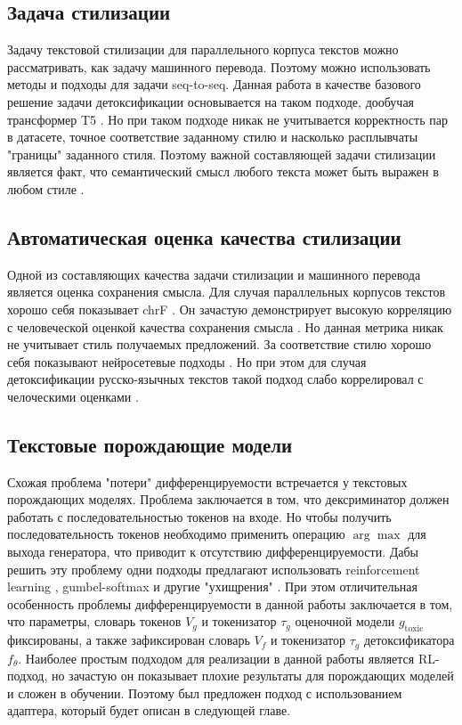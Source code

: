 \subsection{Задача стилизации}

Задачу текстовой стилизации для параллельного корпуса текстов можно рассматривать, как задачу машинного перевода. 
Поэтому можно использовать методы и подходы для задачи seq-to-seq. 
Данная работа в качестве базового решение задачи детоксификации основывается на таком подходе, дообучая трансформер T5 \cite{t5}.
Но при таком подходе никак не учитывается корректность пар в датасете, точное соответствие заданному стилю и насколько расплывчаты "границы" заданного стиля.
Поэтому важной составляющей задачи стилизации является факт, что семантический смысл любого текста может быть выражен в любом стиле \cite{Tikhonov2018WhatIW}.   

\subsection{Автоматическая оценка качества стилизации}
Одной из составляющих качества задачи стилизации и машинного перевода является оценка сохранения смысла. 
Для случая параллельных корпусов текстов хорошо себя показывает chrF \cite{popovic-2015-chrf}.
Он зачастую демонстрирует высокую корреляцию с человеческой оценкой качества сохранения смысла \cite{briakou-etal-2021-evaluating, logacheva-etal-2022-study}. 
Но данная метрика никак не учитывает стиль получаемых предложений.
За соответствие стилю хорошо себя показывают нейросетевые подходы \cite{briakou-etal-2021-evaluating}. 
Но при этом для случая детоксификации русско-язычных текстов такой подход слабо коррелировал с челоческими оценками \cite{logacheva-etal-2022-study}.

\subsection{Текстовые порождающие модели}
Схожая проблема "потери" дифференцируемости встречается у текстовых порождающих моделях. 
Проблема заключается в том, что дексриминатор должен работать с последовательностью токенов на входе. 
Но чтобы получить последовательность токенов необходимо применить операцию $\arg\max$ для выхода генератора, что приводит к отсутствию дифференцируемости. 
Дабы решить эту проблему одни подходы предлагают использовать reinforcement learning \cite{Yu_Zhang_Wang_Yu_2017}, gumbel-softmax \cite{kusner2016gans} и другие "ухищрения" \cite{gan-wo-rl, gan-bert}.
При этом отличительная особенность проблемы дифференцируемости в данной работы заключается в том, что параметры, словарь токенов $V_{g}$ и токенизатор $\tau_{g}$ оценочной модели $g_{\text{toxic}}$ фиксированы, а также зафиксирован словарь $V_{f}$ и токенизатор $\tau_{g}$ детоксификатора $f_{\theta}$. 
Наиболее простым подходом для реализации в данной работы является RL-подход, но зачастую он показывает плохие результаты для порождающих моделей и сложен в обучении.
Поэтому был предложен подход с использованием адаптера, который будет описан в следующей главе. 
